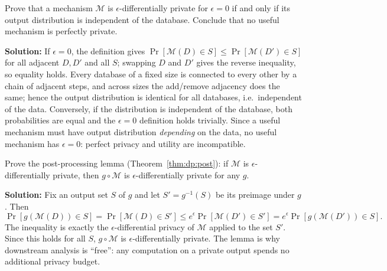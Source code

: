 \begin{exercise}[Basic]
Prove that a mechanism $\mathcal{M}$ is $\epsilon$-differentially private for $\epsilon = 0$ if and only if its output distribution is independent of the database. Conclude that no useful mechanism is perfectly private.
\end{exercise}
\textbf{Solution:} If $\epsilon = 0$, the definition gives $\Pr[\mathcal{M}(D) \in S] \le \Pr[\mathcal{M}(D') \in S]$ for all adjacent $D, D'$ and all $S$; swapping $D$ and $D'$ gives the reverse inequality, so equality holds. Every database of a fixed size is connected to every other by a chain of adjacent steps, and across sizes the add/remove adjacency does the same; hence the output distribution is identical for all databases, i.e.\ independent of the data. Conversely, if the distribution is independent of the database, both probabilities are equal and the $\epsilon = 0$ definition holds trivially. Since a useful mechanism must have output distribution \emph{depending} on the data, no useful mechanism has $\epsilon = 0$: perfect privacy and utility are incompatible.

\begin{exercise}[Intermediate]
Prove the post-processing lemma (Theorem~\ref{thm:dp:post}): if $\mathcal{M}$ is $\epsilon$-differentially private, then $g \circ \mathcal{M}$ is $\epsilon$-differentially private for any $g$.
\end{exercise}
\textbf{Solution:} Fix an output set $S$ of $g$ and let $S' = g^{-1}(S)$ be its preimage under $g$. Then
\[
\Pr[g(\mathcal{M}(D)) \in S] = \Pr[\mathcal{M}(D) \in S'] \le e^{\epsilon} \Pr[\mathcal{M}(D') \in S'] = e^{\epsilon} \Pr[g(\mathcal{M}(D')) \in S].
\]
The inequality is exactly the $\epsilon$-differential privacy of $\mathcal{M}$ applied to the set $S'$. Since this holds for all $S$, $g \circ \mathcal{M}$ is $\epsilon$-differentially private. The lemma is why downstream analysis is ``free'': any computation on a private output spends no additional privacy budget.

